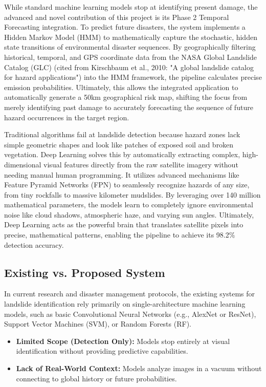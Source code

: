 \documentclass[11pt,a4paper]{article}
\begin{document}
While standard machine learning models stop at identifying present damage, the advanced and novel contribution of this project is its Phase 2 Temporal Forecasting integration. To predict future disasters, the system implements a Hidden Markov Model (HMM) to mathematically capture the stochastic, hidden state transitions of environmental disaster sequences. By geographically filtering historical, temporal, and GPS coordinate data from the NASA Global Landslide Catalog (GLC) (cited from Kirschbaum et al., 2010: "A global landslide catalog for hazard applications") into the HMM framework, the pipeline calculates precise emission probabilities. Ultimately, this allows the integrated application to automatically generate a 50km geographical risk map, shifting the focus from merely identifying past damage to accurately forecasting the sequence of future hazard occurrences in the target region.

Traditional algorithms fail at landslide detection because hazard zones lack simple geometric shapes and look like patches of exposed soil and broken vegetation. Deep Learning solves this by automatically extracting complex, high-dimensional visual features directly from the raw satellite imagery without needing manual human programming. It utilizes advanced mechanisms like Feature Pyramid Networks (FPN) to seamlessly recognize hazards of any size, from tiny rockfalls to massive kilometer mudslides. By leveraging over 140 million mathematical parameters, the models learn to completely ignore environmental noise like cloud shadows, atmospheric haze, and varying sun angles. Ultimately, Deep Learning acts as the powerful brain that translates satellite pixels into precise, mathematical patterns, enabling the pipeline to achieve its 98.2\% detection accuracy.

\subsection*{Existing vs. Proposed System}
In current research and disaster management protocols, the existing systems for landslide identification rely primarily on single-architecture machine learning models, such as basic Convolutional Neural Networks (e.g., AlexNet or ResNet), Support Vector Machines (SVM), or Random Forests (RF).
\begin{itemize}
    \item \textbf{Limited Scope (Detection Only):} Models stop entirely at visual identification without providing predictive capabilities.
    \item \textbf{Lack of Real-World Context:} Models analyze images in a vacuum without connecting to global history or future probabilities.
\end{itemize}
\end{document}
